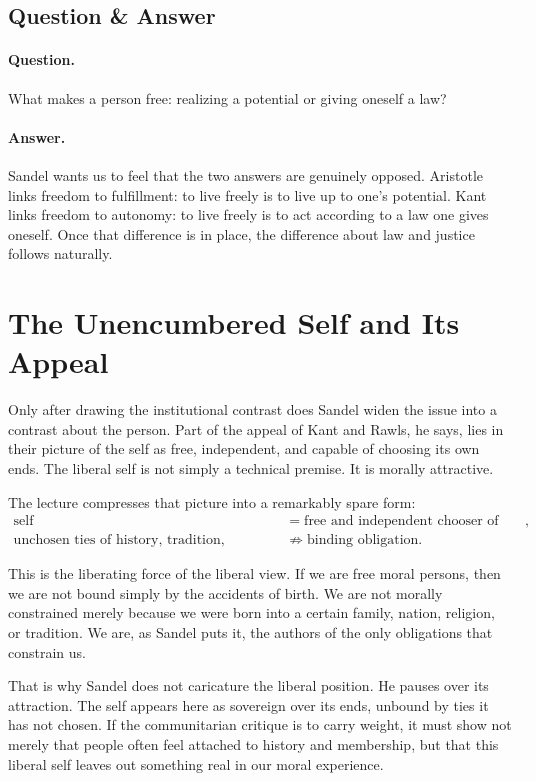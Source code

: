 \subsection{Question \& Answer}

\paragraph{Question.} What makes a person free: realizing a potential or giving oneself a law?

\paragraph{Answer.} Sandel wants us to feel that the two answers are genuinely opposed. Aristotle links freedom to fulfillment: to live freely is to live up to one's potential. Kant links freedom to autonomy: to live freely is to act according to a law one gives oneself. Once that difference is in place, the difference about law and justice follows naturally.

\section{The Unencumbered Self and Its Appeal}

Only after drawing the institutional contrast does Sandel widen the issue into a contrast about the person. Part of the appeal of Kant and Rawls, he says, lies in their picture of the self as free, independent, and capable of choosing its own ends. The liberal self is not simply a technical premise. It is morally attractive.

The lecture compresses that picture into a remarkably spare form:
\begin{align}
\text{self} &= \text{free and independent chooser of ends}, \\
\text{unchosen ties of history, tradition, inherited status} &\not\Longrightarrow \text{binding obligation}.
\end{align}

This is the liberating force of the liberal view. If we are free moral persons, then we are not bound simply by the accidents of birth. We are not morally constrained merely because we were born into a certain family, nation, religion, or tradition. We are, as Sandel puts it, the authors of the only obligations that constrain us.

That is why Sandel does not caricature the liberal position. He pauses over its attraction. The self appears here as sovereign over its ends, unbound by ties it has not chosen. If the communitarian critique is to carry weight, it must show not merely that people often feel attached to history and membership, but that this liberal self leaves out something real in our moral experience.

